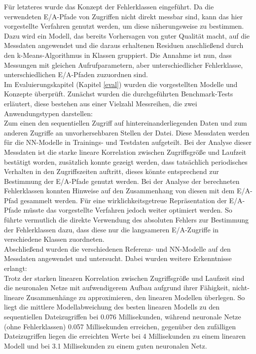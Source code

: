 \documentclass[
	twoside,
	12pt,
	a4paper,
	BCOR10mm,
	DIV14,
	listof=totoc,
	bibliography=totoc,
	headsepline
]{scrreprt}
\begin{document}
Für letzteres wurde das Konzept der Fehlerklassen eingeführt. Da die verwendeten E/A-Pfade von Zugriffen nicht direkt messbar sind, kann das hier vorgestellte Verfahren genutzt werden, um diese näherungsweise zu bestimmen. Dazu wird ein Modell, das bereits Vorhersagen von guter Qualität macht, auf die Messdaten angewendet und die daraus erhaltenen Residuen anschließend durch den k-Means-Algorithmus in Klassen gruppiert. Die Annahme ist nun, dass Messungen mit gleichen Aufrufparametern, aber unterschiedlicher Fehlerklasse, unterschiedlichen E/A-Pfaden zuzuordnen sind.\\
Im Evaluierungskapitel (Kapitel \ref{eval}) wurden die vorgestellten Modelle und Konzepte überprüft.
Zunächst wurden die durchgeführten Benchmark-Tests erläutert, diese bestehen aus einer Vielzahl Messreihen, die zwei Anwendungstypen darstellen:\\
Zum einen den sequentiellen Zugriff auf hintereinanderliegenden Daten und zum anderen Zugriffe an unvorhersehbaren Stellen der Datei. Diese Messdaten werden für die NN-Modelle in Trainings- und Testdaten aufgeteilt.
Bei der Analyse dieser Messdaten ist die starke lineare Korrelation zwischen Zugriffsgröße und Laufzeit bestätigt worden, zusätzlich konnte gezeigt werden, dass tatsächlich periodisches Verhalten in den Zugriffszeiten auftritt, dieses könnte entsprechend zur Bestimmung der E/A-Pfade genutzt werden.
Bei der Analyse der berechneten Fehlerklassen konnten Hinweise auf den Zusammenhang von diesen mit dem E/A-Pfad gesammelt werden. Für eine wirklichkeitsgetreue Repräsentation der E/A-Pfade müsste das vorgestellte Verfahren jedoch weiter optimiert werden. 
So führte vermutlich die direkte Verwendung des absoluten Fehlers zur Bestimmung der Fehlerklassen dazu, dass diese nur die langsameren E/A-Zugriffe in verschiedene Klassen zuordneten.\\
Abschließend wurden die verschiedenen Referenz- und NN-Modelle auf den Messdaten angewendet und untersucht. Dabei wurden weitere Erkenntnisse erlangt:\\
Trotz der starken linearen Korrelation zwischen Zugriffsgröße und Laufzeit sind die neuronalen Netze mit aufwendigerem Aufbau aufgrund ihrer Fähigkeit, nicht-lineare Zusammenhänge zu approximieren, den linearen Modellen überlegen. So liegt die mittlere Modellabweichung des besten linearen Modells zu den sequentiellen Dateizugriffen bei 0.076 Millisekunden, während neuronale Netze (ohne Fehlerklassen) 0.057 Millisekunden erreichen, gegenüber den zufälligen Dateizugriffen liegen die erreichten Werte bei 4 Millisekunden zu einem linearen Modell und bei 3.1 Millisekunden zu einem guten neuronalen Netz.
\end{document}
